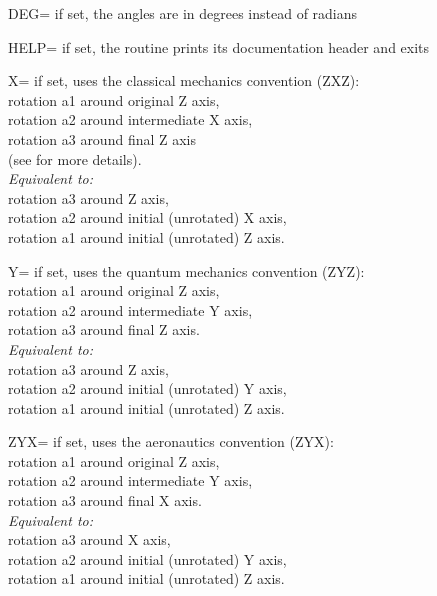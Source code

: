\begin{keywords}
  \begin{kwlist}{} %
    \item[DEG=]  
      if set, the angles are in degrees instead of radians

    \item[HELP=]  
      if set, the routine prints its documentation header and exits

    \item[X=]  
      if set, uses the classical mechanics convention (ZXZ):\\
	rotation a1 around original Z axis, \\
	rotation a2 around intermediate X axis, \\
        rotation a3 around final Z axis \\
        (see  for more details). \\
	{\em Equivalent to:} \\
	rotation a3 around Z axis, \\
	rotation a2 around initial (unrotated) X axis, \\
	rotation a1 around initial (unrotated) Z axis.\\

    \item[Y=]  
      if set, uses the quantum mechanics convention (ZYZ):\\
	rotation a1 around original Z axis, \\
	rotation a2 around intermediate Y axis, \\
        rotation a3 around final Z axis.\\
	{\em Equivalent to:} \\
	rotation a3 around Z axis, \\
	rotation a2 around initial (unrotated) Y axis, \\
	rotation a1 around initial (unrotated) Z axis.

    \item[ZYX=]  
      if set, uses the aeronautics convention (ZYX):\\
	rotation a1 around original Z axis, \\
	rotation a2 around intermediate Y axis, \\
        rotation a3 around final X axis.\\
	{\em Equivalent to:} \\
	rotation a3 around X axis, \\
	rotation a2 around initial (unrotated) Y axis, \\
	rotation a1 around initial (unrotated) Z axis.
  \end{kwlist}
\end{keywords}  

